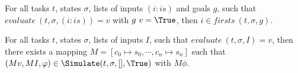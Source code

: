 \begin{lemma}
  \label{lem:completefirsts}

  For all tasks $t$, states $\sigma$, lists of inputs $(i:is)$ and goals $g$,
  such that $evaluate\ (t,\sigma,(i:is))=v$ with $g\ v =\True$,
  then $i\in firsts\ (t,\sigma,g)$.

\end{lemma}


\begin{lemma}
  \label{lem:completesimulate}
  For all tasks $t$, states $\sigma$, lists of inputs $I$,
  such that $evaluate\ (t,\sigma,I)=v$,
  then there exists a mapping $M = [c_0\mapsto s_0,\cdots,c_n\mapsto s_n]$
  such that $(M v,M I,\phi)\in\Simulate(t,\sigma,[],\True)$ with $M \phi$.
\end{lemma}
